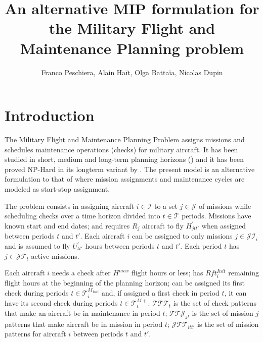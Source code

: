 \documentclass{roadef}
\begin{document}
\title{An alternative MIP formulation for the Military Flight and Maintenance Planning problem}

\author{Franco Peschiera, Alain Ha{\"i}t, Olga Batta{\"i}a, Nicolas Dupin}



\maketitle
\thispagestyle{empty}


\section{Introduction}
    The Military Flight and Maintenance Planning Problem assigns missions and schedules maintenance operations (checks) for military aircraft. It has been studied in short, medium and long-term planning horizons (\cite{Cho2011,Kozanidis2008,Verhoeff2015,PeschieraR2018}) and it has been proved NP-Hard in its longterm variant by \cite{Peschiera2019}. The present model is an alternative formulation to that of \cite{Peschiera2019} where mission assignments and maintenance cycles are modeled as start-stop assignment.

    The problem consists in assigning aircraft $i \in \mathcal{I}$ to a set $j \in \mathcal{J}$ of missions while scheduling checks over a time horizon divided into $t \in \mathcal{T}$ periods. Missions have known start and end dates; and requires $R_j$ aircraft to fly $H^\prime_{jtt'}$ when assigned between periods $t$ and $t'$. Each aircraft $i$ can be assigned to only missions $j \in \mathcal{JI}_i$ and is assumed to fly $U^{\prime}_{tt'}$ hours between periods $t$ and $t'$. Each period $t$ has $j \in \mathcal{JT}_t$ active missions.

    Each aircraft $i$ needs a check after $H^{max}$ flight hours or less; has $Rft^{Init}_i$ remaining flight hours at the beginning of the planning horizon; can be assigned its first check during periods $t \in \mathcal{T}^{M_{Init}}_i$ and, if assigned a first check in period $t$, it can have its second check during periods $t \in \mathcal{T}^{M+}_{t}$. $\mathcal{TTT}_t$ is the set of check patterns that make an aircraft be in maintenance in period $t$; $\mathcal{TTJ}_{jt}$ is the set of mission $j$ patterns that make aircraft be in mission in period $t$; $\mathcal{JTT}_{itt'}$ is the set of mission patterns for aircraft $i$ between periods $t$ and $t'$.
\end{document}
